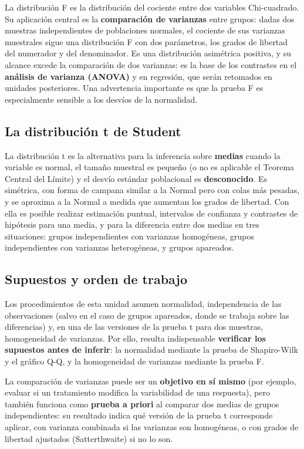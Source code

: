\documentclass[
  spanish,
  letterpaper,
  DIV=11,
  numbers=noendperiod]{scrreprt}
\begin{document}
La distribución F es la distribución del cociente entre dos variables
Chi-cuadrado. Su aplicación central es la \textbf{comparación de
varianzas} entre grupos: dadas dos muestras independientes de
poblaciones normales, el cociente de sus varianzas muestrales sigue una
distribución F con dos parámetros, los grados de libertad del numerador
y del denominador. Es una distribución asimétrica positiva, y su alcance
excede la comparación de dos varianzas: es la base de los contrastes en
el \textbf{análisis de varianza (ANOVA)} y en regresión, que serán
retomados en unidades posteriores. Una advertencia importante es que la
prueba F es especialmente sensible a los desvíos de la normalidad.

\subsection{La distribución t de
Student}\label{la-distribuciuxf3n-t-de-student}

La distribución t es la alternativa para la inferencia sobre
\textbf{medias} cuando la variable es normal, el tamaño muestral es
pequeño (o no es aplicable el Teorema Central del Límite) y el desvío
estándar poblacional es \textbf{desconocido}. Es simétrica, con forma de
campana similar a la Normal pero con colas más pesadas, y se aproxima a
la Normal a medida que aumentan los grados de libertad. Con ella es
posible realizar estimación puntual, intervalos de confianza y
contrastes de hipótesis para una media, y para la diferencia entre dos
medias en tres situaciones: grupos independientes con varianzas
homogéneas, grupos independientes con varianzas heterogéneas, y grupos
apareados.

\subsection{Supuestos y orden de
trabajo}\label{supuestos-y-orden-de-trabajo}

Los procedimientos de esta unidad asumen normalidad, independencia de
las observaciones (salvo en el caso de grupos apareados, donde se
trabaja sobre las diferencias) y, en una de las versiones de la prueba t
para dos muestras, homogeneidad de varianzas. Por ello, resulta
indispensable \textbf{verificar los supuestos antes de inferir}: la
normalidad mediante la prueba de Shapiro-Wilk y el gráfico Q-Q, y la
homogeneidad de varianzas mediante la prueba F.

La comparación de varianzas puede ser un \textbf{objetivo en sí mismo}
(por ejemplo, evaluar si un tratamiento modifica la variabilidad de una
respuesta), pero también funciona como \textbf{prueba a priori} al
comparar dos medias de grupos independientes: su resultado indica qué
versión de la prueba t corresponde aplicar, con varianza combinada si
las varianzas son homogéneas, o con grados de libertad ajustados
(Satterthwaite) si no lo son.
\end{document}
